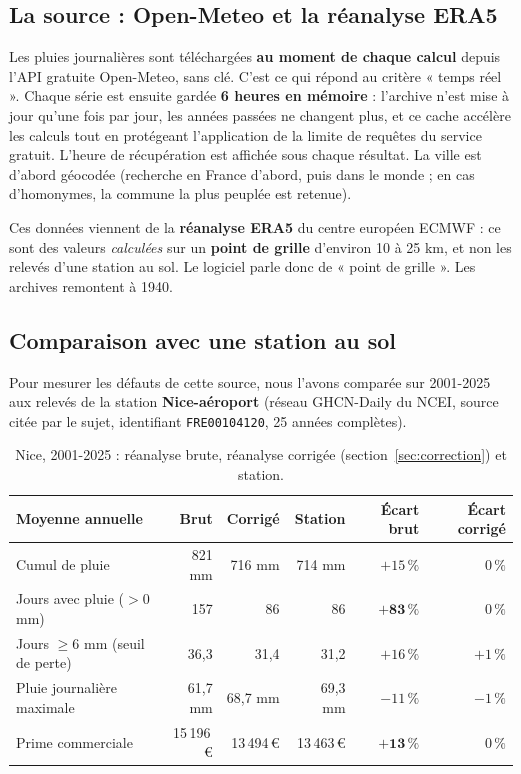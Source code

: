\documentclass[11pt,a4paper]{article}
\newcommand{\eur}[1]{#1\,€}
\begin{document}
\subsection{La source : Open-Meteo et la réanalyse ERA5}
Les pluies journalières sont téléchargées \textbf{au moment de chaque calcul} depuis l'API gratuite Open-Meteo, sans clé.
C'est ce qui répond au critère « temps réel ». Chaque série est ensuite gardée \textbf{6 heures en mémoire} : l'archive n'est mise à jour qu'une fois par jour, les années passées ne changent plus, et ce cache accélère les calculs tout en protégeant l'application de la limite de requêtes du service gratuit. L'heure de récupération est affichée sous chaque résultat. La ville est d'abord géocodée (recherche en France d'abord, puis dans le
monde ; en cas d'homonymes, la commune la plus peuplée est retenue).

Ces données viennent de la \textbf{réanalyse ERA5} du centre européen ECMWF : ce sont des valeurs \emph{calculées} sur un
\textbf{point de grille} d'environ 10 à 25 km, et non les relevés d'une station au sol. Le logiciel parle donc de
« point de grille ». Les archives remontent à 1940.

\subsection{Comparaison avec une station au sol}
Pour mesurer les défauts de cette source, nous l'avons comparée sur 2001-2025 aux relevés de la station
\textbf{Nice-aéroport} (réseau GHCN-Daily du NCEI, source citée par le sujet, identifiant \texttt{FRE00104120},
25 années complètes).

\begin{table}[H]
\centering\footnotesize
\setlength{\tabcolsep}{4pt}
\begin{tabular}{lrrrrr}
\toprule
Moyenne annuelle & Brut & Corrigé & Station & Écart brut & Écart corrigé\\
\midrule
Cumul de pluie & 821 mm & 716 mm & 714 mm & $+15\,\%$ & $0\,\%$\\
Jours avec pluie ($>0$ mm) & 157 & 86 & 86 & $\mathbf{+83\,\%}$ & $0\,\%$\\
Jours $\ge 6$ mm (seuil de perte) & 36,3 & 31,4 & 31,2 & $+16\,\%$ & $+1\,\%$\\
Pluie journalière maximale & 61,7 mm & 68,7 mm & 69,3 mm & $-11\,\%$ & $-1\,\%$\\
Prime commerciale & \eur{15\,196} & \eur{13\,494} & \eur{13\,463} & $\mathbf{+13\,\%}$ & $0\,\%$\\
\bottomrule
\end{tabular}
\caption{Nice, 2001-2025 : réanalyse brute, réanalyse corrigée (section~\ref{sec:correction}) et station.}
\end{table}
\end{document}
